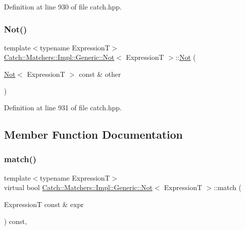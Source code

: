 Definition at line 930 of file catch.\+hpp.

\hypertarget{class_catch_1_1_matchers_1_1_impl_1_1_generic_1_1_not_a46eccbbaeec259d3536aa2a29f95208f}{}\label{class_catch_1_1_matchers_1_1_impl_1_1_generic_1_1_not_a46eccbbaeec259d3536aa2a29f95208f} 
\subsubsection{\texorpdfstring{Not()}{Not()}\hspace{0.1cm}{\footnotesize\ttfamily [2/2]}}
{\footnotesize\ttfamily template$<$typename ExpressionT$>$ \\
\hyperlink{class_catch_1_1_matchers_1_1_impl_1_1_generic_1_1_not}{Catch\+::\+Matchers\+::\+Impl\+::\+Generic\+::\+Not}$<$ ExpressionT $>$\+::\hyperlink{class_catch_1_1_matchers_1_1_impl_1_1_generic_1_1_not}{Not} (\begin{DoxyParamCaption}\item[{\hyperlink{class_catch_1_1_matchers_1_1_impl_1_1_generic_1_1_not}{Not}$<$ ExpressionT $>$ const \&}]{other }\end{DoxyParamCaption})\hspace{0.3cm}{\ttfamily [inline]}}



Definition at line 931 of file catch.\+hpp.



\subsection{Member Function Documentation}
\hypertarget{class_catch_1_1_matchers_1_1_impl_1_1_generic_1_1_not_a18c49fc6fb73a42d54650dafc18c7db1}{}\label{class_catch_1_1_matchers_1_1_impl_1_1_generic_1_1_not_a18c49fc6fb73a42d54650dafc18c7db1} 
\subsubsection{\texorpdfstring{match()}{match()}}
{\footnotesize\ttfamily template$<$typename ExpressionT$>$ \\
virtual bool \hyperlink{class_catch_1_1_matchers_1_1_impl_1_1_generic_1_1_not}{Catch\+::\+Matchers\+::\+Impl\+::\+Generic\+::\+Not}$<$ ExpressionT $>$\+::match (\begin{DoxyParamCaption}\item[{ExpressionT const \&}]{expr }\end{DoxyParamCaption}) const\hspace{0.3cm}{\ttfamily [inline]}, {\ttfamily [virtual]}}



